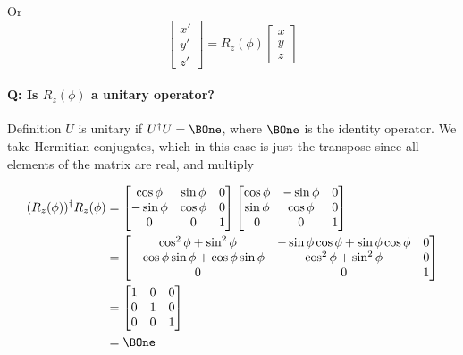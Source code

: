 Or
\begin{equation}\label{eqn:PHY356FDec7:30}
\begin{bmatrix}
x'  \\
y' \\
z'
\end{bmatrix}
=
R_z(\phi)
\begin{bmatrix}
x  \\
y \\
z
\end{bmatrix}
\end{equation}

\paragraph{Q: Is \(R_z(\phi)\) a unitary operator?}

Definition \(U\) is unitary if \(U^\dagger U = \BOne\), where \(\BOne\) is the identity operator.  We take Hermitian conjugates, which in this case is just the transpose since all elements of the matrix are real, and multiply

\begin{equation}\label{eqn:lecture12rotationsAndAngularMomentum:240}
\begin{aligned}
(R_z(\phi))^\dagger R_z(\phi) &=
\begin{bmatrix}
\cos \phi & \sin\phi & 0 \\
-\sin \phi & \cos\phi & 0 \\
0 & 0 & 1
\end{bmatrix}
\begin{bmatrix}
\cos \phi &- \sin\phi & 0 \\
\sin \phi & \cos\phi & 0 \\
0 & 0 & 1
\end{bmatrix} \\
&=
\begin{bmatrix}
\cos^2 \phi + \sin^2\phi  & -\sin\phi \cos\phi  + \sin\phi \cos\phi  & 0 \\
-\cos\phi \sin\phi  + \cos\phi \sin\phi  & \cos^2\phi  + \sin^2 \phi & 0 \\
0 & 0 & 1 \\
\end{bmatrix} \\
&=
\begin{bmatrix}
1 & 0 & 0 \\
0 & 1 & 0 \\
0 & 0 & 1 \\
\end{bmatrix} \\
&= \BOne
\end{aligned}
\end{equation}

